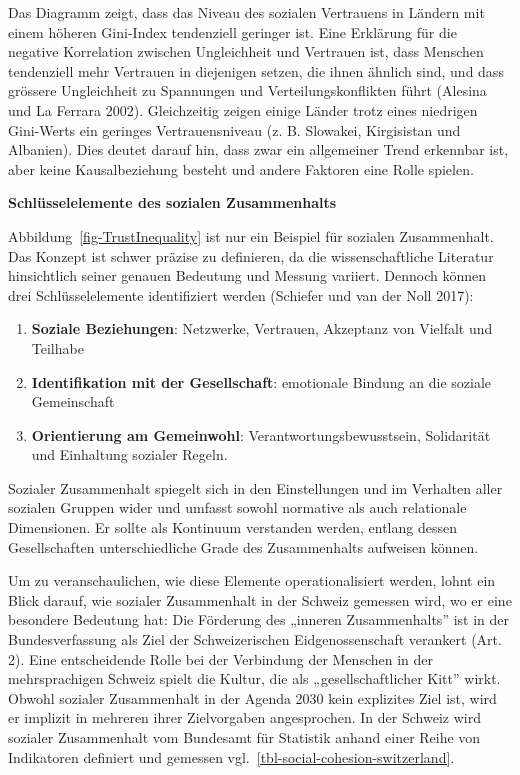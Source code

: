 \documentclass[
  nswissgerman,
  a4paper,
  openany]{book}
\begin{document}
Das Diagramm zeigt, dass das Niveau des sozialen Vertrauens in Ländern
mit einem höheren Gini-Index tendenziell geringer ist. Eine Erklärung
für die negative Korrelation zwischen Ungleichheit und Vertrauen ist,
dass Menschen tendenziell mehr Vertrauen in diejenigen setzen, die ihnen
ähnlich sind, und dass grössere Ungleichheit zu Spannungen und
Verteilungskonflikten führt (Alesina und La Ferrara 2002). Gleichzeitig
zeigen einige Länder trotz eines niedrigen Gini-Werts ein geringes
Vertrauensniveau (z. B. Slowakei, Kirgisistan und Albanien). Dies deutet
darauf hin, dass zwar ein allgemeiner Trend erkennbar ist, aber keine
Kausalbeziehung besteht und andere Faktoren eine Rolle spielen.

\textbf{Schlüsselelemente des sozialen Zusammenhalts}

Abbildung~\ref{fig-TrustInequality} ist nur ein Beispiel für sozialen
Zusammenhalt. Das Konzept ist schwer präzise zu definieren, da die
wissenschaftliche Literatur hinsichtlich seiner genauen Bedeutung und
Messung variiert. Dennoch können drei Schlüsselelemente identifiziert
werden ({Schiefer und van der Noll} 2017):

\begin{enumerate}
\def\labelenumi{\arabic{enumi}.}
\item
  \textbf{Soziale Beziehungen}: Netzwerke, Vertrauen, Akzeptanz von
  Vielfalt und Teilhabe
\item
  \textbf{Identifikation mit der Gesellschaft}: emotionale Bindung an
  die soziale Gemeinschaft
\item
  \textbf{Orientierung am Gemeinwohl}: Verantwortungsbewusstsein,
  Solidarität und Einhaltung sozialer Regeln.
\end{enumerate}

Sozialer Zusammenhalt spiegelt sich in den Einstellungen und im
Verhalten aller sozialen Gruppen wider und umfasst sowohl normative als
auch relationale Dimensionen. Er sollte als Kontinuum verstanden werden,
entlang dessen Gesellschaften unterschiedliche Grade des Zusammenhalts
aufweisen können.

Um zu veranschaulichen, wie diese Elemente operationalisiert werden,
lohnt ein Blick darauf, wie sozialer Zusammenhalt in der Schweiz
gemessen wird, wo er eine besondere Bedeutung hat: Die Förderung des
„inneren Zusammenhalts'' ist in der Bundesverfassung als Ziel der
Schweizerischen Eidgenossenschaft verankert (Art. 2). Eine entscheidende
Rolle bei der Verbindung der Menschen in der mehrsprachigen Schweiz
spielt die Kultur, die als „gesellschaftlicher Kitt'' wirkt. Obwohl
sozialer Zusammenhalt in der Agenda 2030 kein explizites Ziel ist, wird
er implizit in mehreren ihrer Zielvorgaben angesprochen. In der Schweiz
wird sozialer Zusammenhalt vom Bundesamt für Statistik anhand einer
Reihe von Indikatoren definiert und gemessen
vgl.~\ref{tbl-social-cohesion-switzerland}.
\end{document}

